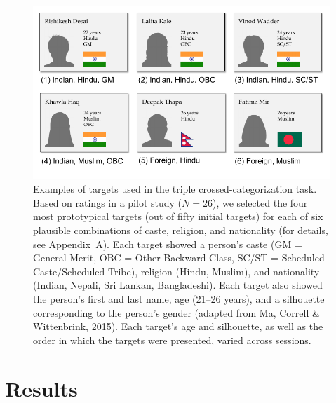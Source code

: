 \documentclass[12pt, a4paper]{article}
\begin{document}
\begin{figure}
\centering
\includegraphics[scale=1]{../figures/figure-2}
\caption{Examples of targets used in the triple crossed-categorization task. Based on ratings in a pilot study ($N = 26$), we selected the four most prototypical targets (out of fifty initial targets) for each of six plausible combinations of caste, religion, and nationality (for details, see Appendix~A). Each target showed a person's caste (GM = General Merit, OBC = Other Backward Class, SC/ST = Scheduled Caste/Scheduled Tribe), religion (Hindu, Muslim), and nationality (Indian, Nepali, Sri Lankan, Bangladeshi). Each target also showed the person's first and last name, age (21--26 years), and a silhouette corresponding to the person's gender (adapted from Ma, Correll \& Wittenbrink, 2015). Each target's age and silhouette, as well as the order in which the targets were presented, varied across sessions.}
\label{fig:f2}
\end{figure}

\section{Results}
\end{document}
